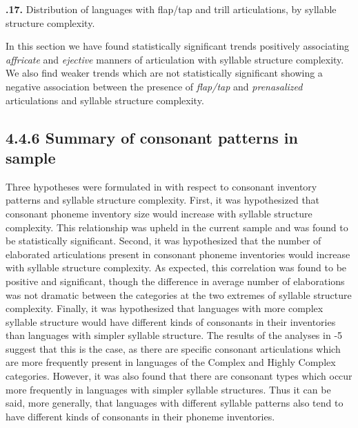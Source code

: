 \textbf{.17.} Distribution of languages with flap/tap and trill articulations, by syllable structure complexity.

  In this section we have found statistically significant trends positively associating \textit{affricate} and \textit{ejective} manners of articulation with syllable structure complexity. We also find weaker trends which are not statistically significant showing a negative association between the presence of \textit{flap/tap} and \textit{prenasalized} articulations and syllable structure complexity.

\subsection{4.4.6 Summary of consonant patterns in sample}

  Three hypotheses were formulated in  with respect to consonant inventory patterns and syllable structure complexity. First, it was hypothesized that consonant phoneme inventory size would increase with syllable structure complexity. This relationship was upheld in the current sample and was found to be statistically significant. Second, it was hypothesized that the number of elaborated articulations present in consonant phoneme inventories would increase with syllable structure complexity. As expected, this correlation was found to be positive and significant, though the difference in average number of elaborations was not dramatic between the categories at the two extremes of syllable structure complexity. Finally, it was hypothesized that languages with more complex syllable structure would have different kinds of consonants in their inventories than languages with simpler syllable structure. The results of the analyses in -5 suggest that this is the case, as there are specific consonant articulations which are more frequently present in languages of the Complex and Highly Complex categories. However, it was also found that there are consonant types which occur more frequently in languages with simpler syllable structures. Thus it can be said, more generally, that languages with different syllable patterns also tend to have different kinds of consonants in their phoneme inventories.

